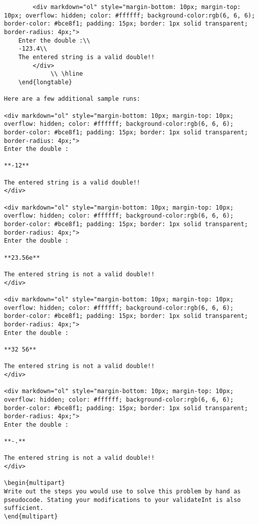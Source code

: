 {{{{{{{{{{\begin{problem}
\begin{verbatim}
        <div markdown="ol" style="margin-bottom: 10px; margin-top: 10px; overflow: hidden; color: #ffffff; background-color:rgb(6, 6, 6); border-color: #bce8f1; padding: 15px; border: 1px solid transparent; border-radius: 4px;">
    Enter the double :\\
    -123.4\\
    The entered string is a valid double!!
        </div>
             \\ \hline
    \end{longtable}

Here are a few additional sample runs:

<div markdown="ol" style="margin-bottom: 10px; margin-top: 10px; overflow: hidden; color: #ffffff; background-color:rgb(6, 6, 6); border-color: #bce8f1; padding: 15px; border: 1px solid transparent; border-radius: 4px;">
Enter the double :

**-12**

The entered string is a valid double!!
</div>

<div markdown="ol" style="margin-bottom: 10px; margin-top: 10px; overflow: hidden; color: #ffffff; background-color:rgb(6, 6, 6); border-color: #bce8f1; padding: 15px; border: 1px solid transparent; border-radius: 4px;">
Enter the double :

**23.56e**

The entered string is not a valid double!!
</div>

<div markdown="ol" style="margin-bottom: 10px; margin-top: 10px; overflow: hidden; color: #ffffff; background-color:rgb(6, 6, 6); border-color: #bce8f1; padding: 15px; border: 1px solid transparent; border-radius: 4px;">
Enter the double :

**32 56**

The entered string is not a valid double!!
</div>

<div markdown="ol" style="margin-bottom: 10px; margin-top: 10px; overflow: hidden; color: #ffffff; background-color:rgb(6, 6, 6); border-color: #bce8f1; padding: 15px; border: 1px solid transparent; border-radius: 4px;">
Enter the double :

**-.**

The entered string is not a valid double!!
</div>

\begin{multipart}
Write out the steps you would use to solve this problem by hand as pseudocode. Stating your modifications to your validateInt is also sufficient.
\end{multipart}


\end{verbatim}
\end{problem}}}}}}}}}}}
